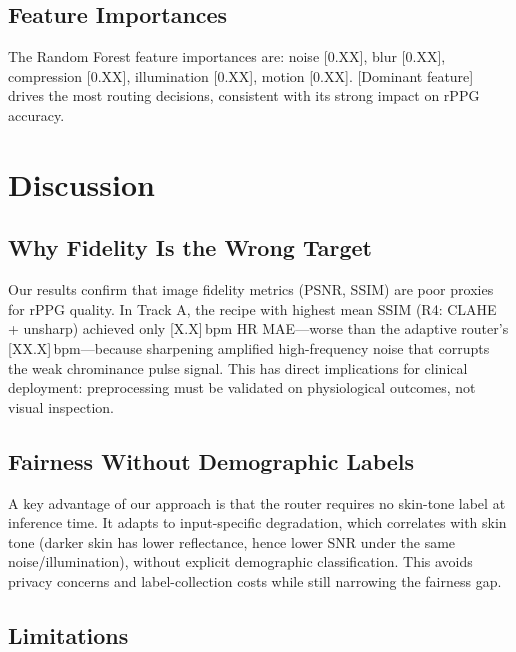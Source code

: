 \documentclass[conference]{IEEEtran}
\begin{document}
\subsection{Feature Importances}
\label{subsec:importances}

The Random Forest feature importances are: noise [0.XX], blur [0.XX], compression [0.XX], illumination [0.XX], motion [0.XX]. [Dominant feature] drives the most routing decisions, consistent with its strong impact on rPPG accuracy.

\section{Discussion}
\label{sec:discussion}

\subsection{Why Fidelity Is the Wrong Target}
\label{subsec:why_wrong}

Our results confirm that image fidelity metrics (PSNR, SSIM) are poor proxies for rPPG quality. In Track A, the recipe with highest mean SSIM (R4: CLAHE + unsharp) achieved only [X.X]\,bpm HR MAE---worse than the adaptive router's [XX.X]\,bpm---because sharpening amplified high-frequency noise that corrupts the weak chrominance pulse signal. This has direct implications for clinical deployment: preprocessing must be validated on physiological outcomes, not visual inspection.

\subsection{Fairness Without Demographic Labels}
\label{subsec:fairness_disc}

A key advantage of our approach is that the router requires no skin-tone label at inference time. It adapts to input-specific degradation, which correlates with skin tone (darker skin has lower reflectance, hence lower SNR under the same noise/illumination), without explicit demographic classification. This avoids privacy concerns and label-collection costs while still narrowing the fairness gap.

\subsection{Limitations}
\label{subsec:limitations}
\end{document}
